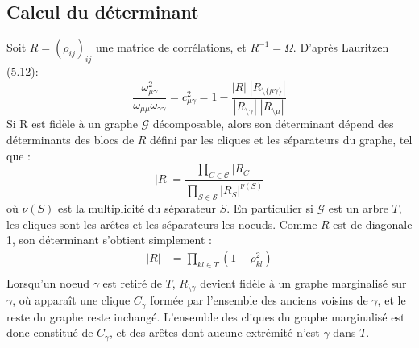 \documentclass[11pt,a4paper]{article}
\begin{document}
\subsection{Calcul du déterminant}
Soit $R=(\rho_{ij})_{ij}$ une matrice de corrélations, et $R^{-1}= \Omega$. D'après Lauritzen (5.12):
$$\frac{\omega_{\mu\gamma}^2}{\omega_{\mu\mu}\omega_{\gamma\gamma}} = c_{\mu\gamma}^2 = 1-\frac{|R|\;|R_{\setminus \{\mu\gamma\}}|}{|R_{\setminus\gamma}|\;|R_{\setminus \mu}|} $$
Si R est fidèle à un graphe $\mathcal{G}$ décomposable, alors son déterminant dépend des déterminants des blocs de $R$ défini par les cliques et les séparateurs du graphe, tel que :
$$|R| = \frac{\prod_{C \in \mathcal{C}} |R_C|}{\prod_{S \in \mathcal{S}} |R_S|^{\nu(S)}} $$
où $\nu(S)$ est la multiplicité du séparateur $S$. En particulier si $\mathcal{G}$ est un arbre $T$, les cliques sont les arêtes et les séparateurs les noeuds. Comme $R$ est de diagonale 1, son déterminant s'obtient simplement :
\begin{align*}
    |R| &=  \prod_{kl\in T} (1-\rho_{kl}^2)\\
\end{align*}
Lorsqu'un noeud $\gamma$ est retiré de $T$, $R_{\setminus \gamma}$ devient fidèle à un graphe marginalisé sur $\gamma$, où apparaît une clique $C_\gamma$ formée par l'ensemble des anciens voisins de $\gamma$, et le reste du graphe reste inchangé. L'ensemble des cliques du graphe marginalisé est donc constitué de $C_\gamma$, et des arêtes dont aucune extrémité n'est $\gamma$ dans $T$.
\end{document}
